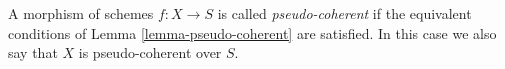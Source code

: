 \begin{definition}
\label{definition-pseudo-coherent}
A morphism of schemes $f : X \to S$ is called {\it pseudo-coherent}
if the equivalent conditions of
Lemma \ref{lemma-pseudo-coherent}
are satisfied. In this case we also say that $X$ is pseudo-coherent
over $S$.
\end{definition}